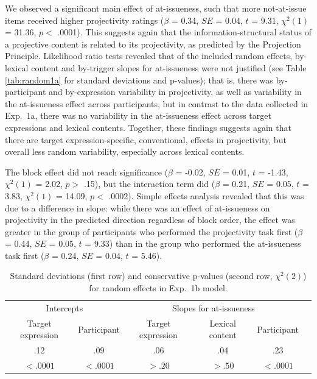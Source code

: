 \documentclass[11pt,fleqn]{article}
\newcommand{\6}{\mbox{$[\hspace*{-.6mm}[$}}
\newcommand{\9}{\mbox{$]\hspace*{-.6mm}]$}}
\newcommand{\tableref}[1]{Table \ref{#1}}
\begin{document}
We observed a significant main effect of at-issueness, such that more not-at-issue items received higher projectivity ratings ($\beta$ = 0.34, $SE$ = 0.04, $t$ = 9.31, $\chi^2(1)$ = 31.36, $p <$ .0001). This suggests again that the information-structural status of a projective content is related to its projectivity, as predicted by the Projection Principle. Likelihood ratio tests revealed that of the included random effects, by-lexical content and by-trigger slopes for at-issueness were not justified (see \tableref{tab:random1a} for standard deviations and p-values); that is, there was by-participant and by-expression variability in projectivity, as well as variability in the at-issueness effect across participants, but in contrast to the data collected in Exp.~1a, there was no variability in the at-issueness effect across target expressions and lexical contents. Together, these findings suggests again that there are target expression-specific, conventional, effects in projectivity, but overall less random variability, especially across lexical contents. 

The block effect did not reach significance ($\beta$ = -0.02, $SE$ = 0.01, $t$ = -1.43, $\chi^2(1)$ = 2.02, $p >$ .15), but the interaction term did ($\beta$ = 0.21, $SE$ = 0.05, $t$ = 3.83, $\chi^2(1)$ = 14.09, $p <$ .0002). Simple effects analysis revealed that this was due to a difference in slope: while there was an effect of at-issueness on projectivity in the predicted direction regardless of block order, the effect was greater in the group of participants who performed the projectivity task first ($\beta$ = 0.44, $SE$ = 0.05, $t$ = 9.33) than in the group who performed the at-issueness task first ($\beta$ = 0.24, $SE$ = 0.04, $t$ = 5.46).


\begin{table}
\caption{Standard deviations (first row) and conservative p-values (second row, $\chi^2(2)$) for random effects in Exp.~1b model.}
\begin{tabular}{c c c c c c }
\toprule
\multicolumn{2}{c}{Intercepts} & \multicolumn{3}{c}{Slopes for at-issueness}\\
Target expression & Participant & Target expression & Lexical content & Participant\\
\midrule
.12 & .09 & .06 & .04 & .23\\
$< .0001$ & $< .0001$ & $> .20$ & $> .50$ & $< .0001$ \\
\bottomrule
\end{tabular}
\label{tab:random1b}
\end{table}
\end{document}
